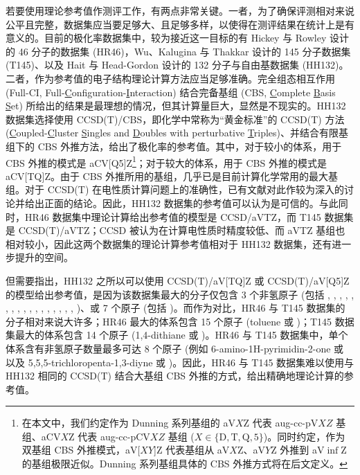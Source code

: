 若要使用理论参考值作测评工作，有两点非常关键。一者，为了确保评测相对来说公平且完整，数据集应当要足够大、且足够多样，以使得在测评结果在统计上是有意义的。目前的极化率数据集中，较为接近这一目标的有 Hickey 与 Rowley 设计的 46 分子的数据集 (HR46)\cite{Hickey-Rowley.JPCA.2014}，Wu、Kalugina 与 Thakkar 设计的 145 分子数据集 (T145)\cite{Wu-Thakkar.CPL.2015}、以及 Hait 与 Head-Gordon 设计的 132 分子与自由基数据集 (HH132)\cite{Hait-Head-Gordon.PCCP.2018}。二者，作为参考值的电子结构理论计算方法应当足够准确。完全组态相互作用 (Full-CI, Full-\underline{C}onfiguration-\underline{I}nteraction) 结合完备基组 (CBS, \underline{C}omplete \underline{B}asis \underline{S}et) 所给出的结果是最理想的情况，但其计算量巨大，显然是不现实的。HH132 数据集选择使用 CCSD(T)/CBS，即化学中常称为“黄金标准”的 CCSD(T) 方法 (\underline{C}oupled-\underline{C}luster \underline{S}ingles and \underline{D}oubles with perturbative \underline{T}riples)\cite{Cizek-Cizek.Wiley.1969, Raghavachari-Head-Gordon.CPL.1989}、并结合有限基组下的 CBS 外推方法\cite{Nyden-Petersson.JCP.1981, Petersson-Mantzaris.JCP.1988}，给出了极化率的参考值。其中，对于较小的体系，用于 CBS 外推的模式是 aCV[Q5]Z\footnote{在本文中，我们约定作为 Dunning 系列基组的 aV$X$Z 代表 aug-cc-pV$XZ$ 基组、aCV$X$Z 代表 aug-cc-pCV$XZ$ 基组 ($X \in \{\mathrm{D, T, Q, 5}\}$)。同时约定，作为双基组 CBS 外推模式，aV[$XY$]Z 代表基组从 aV$X$Z、aV$Y$Z 外推到 aV$\inf$Z 的基组极限近似。Dunning 系列基组具体的 CBS 外推方式将在\alert{后文定义}。}；对于较大的体系，用于 CBS 外推的模式是 aCV[TQ]Z\cite{Hait-Head-Gordon.PCCP.2018, Hait-Head-Gordon.JCTC.2018}。由于 CBS 外推所用的基组，几乎已是目前计算化学常用的最大基组。对于 CCSD(T) 在电性质计算问题上的准确性，已有文献对此作较为深入的讨论并给出正面的结论\cite{Halkier-Joergensen.JCP.1999, Monten-Deleuze.MP.2011, Hait-Head-Gordon.JCTC.2018}。因此，HH132 数据集的参考值可以认为是可信的。与此同时，HR46 数据集中理论计算给出参考值的模型是 CCSD/aVTZ，而 T145 数据集是 CCSD(T)/aVTZ；CCSD 被认为在计算电性质时精度较低、而 aVTZ 基组也相对较小，因此这两个数据集的理论计算参考值相对于 HH132 数据集，还有进一步提升的空间。

但需要指出，HH132 之所以可以使用 CCSD(T)/aV[TQ]Z 或 CCSD(T)/aV[Q5]Z 的模型给出参考值，是因为该数据集最大的分子仅包含 3 个非氢原子 (包括 , , , , , , , , , , , , , , , , , )、或 7 个原子 (包括 )。而作为对比，HR46 与 T145 数据集的分子相对来说大许多；HR46 最大的体系包含 15 个原子 (toluene 或 )；T145 数据集最大的体系包含 14 个原子 (1,4-dithiane 或 )。HR46 与 T145 数据集中，单个体系含有非氢原子数量最多可达 8 个原子 (例如 6-amino-1H-pyrimidin-2-one 或  以及 5,5,5-trichloropenta-1,3-diyne 或 )。因此，HR46 与 T145 数据集难以使用与 HH132 相同的 CCSD(T) 结合大基组 CBS 外推的方式，给出精确地理论计算的参考值。

